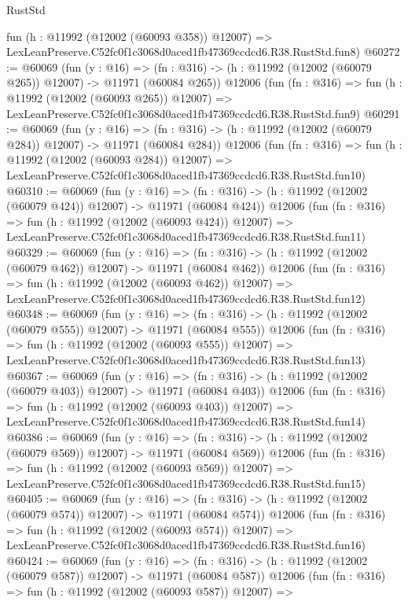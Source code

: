 \begin{lexlean}{RustStd}
\begin{coremodule}
    fun (h : @11992 (@12002 (@60093 @358)) @12007) =>
    LexLeanPreserve.C52fc0f1c3068d0aced1fb47369ccdcd6.R38.RustStd.fun8)
@60272 := @60069
    (fun (y : @16) =>
    (fn : @316) -> (h : @11992 (@12002 (@60079 @265)) @12007) -> @11971 (@60084 @265))
    @12006
    (fun (fn : @316) =>
    fun (h : @11992 (@12002 (@60093 @265)) @12007) =>
    LexLeanPreserve.C52fc0f1c3068d0aced1fb47369ccdcd6.R38.RustStd.fun9)
@60291 := @60069
    (fun (y : @16) =>
    (fn : @316) -> (h : @11992 (@12002 (@60079 @284)) @12007) -> @11971 (@60084 @284))
    @12006
    (fun (fn : @316) =>
    fun (h : @11992 (@12002 (@60093 @284)) @12007) =>
    LexLeanPreserve.C52fc0f1c3068d0aced1fb47369ccdcd6.R38.RustStd.fun10)
@60310 := @60069
    (fun (y : @16) =>
    (fn : @316) -> (h : @11992 (@12002 (@60079 @424)) @12007) -> @11971 (@60084 @424))
    @12006
    (fun (fn : @316) =>
    fun (h : @11992 (@12002 (@60093 @424)) @12007) =>
    LexLeanPreserve.C52fc0f1c3068d0aced1fb47369ccdcd6.R38.RustStd.fun11)
@60329 := @60069
    (fun (y : @16) =>
    (fn : @316) -> (h : @11992 (@12002 (@60079 @462)) @12007) -> @11971 (@60084 @462))
    @12006
    (fun (fn : @316) =>
    fun (h : @11992 (@12002 (@60093 @462)) @12007) =>
    LexLeanPreserve.C52fc0f1c3068d0aced1fb47369ccdcd6.R38.RustStd.fun12)
@60348 := @60069
    (fun (y : @16) =>
    (fn : @316) -> (h : @11992 (@12002 (@60079 @555)) @12007) -> @11971 (@60084 @555))
    @12006
    (fun (fn : @316) =>
    fun (h : @11992 (@12002 (@60093 @555)) @12007) =>
    LexLeanPreserve.C52fc0f1c3068d0aced1fb47369ccdcd6.R38.RustStd.fun13)
@60367 := @60069
    (fun (y : @16) =>
    (fn : @316) -> (h : @11992 (@12002 (@60079 @403)) @12007) -> @11971 (@60084 @403))
    @12006
    (fun (fn : @316) =>
    fun (h : @11992 (@12002 (@60093 @403)) @12007) =>
    LexLeanPreserve.C52fc0f1c3068d0aced1fb47369ccdcd6.R38.RustStd.fun14)
@60386 := @60069
    (fun (y : @16) =>
    (fn : @316) -> (h : @11992 (@12002 (@60079 @569)) @12007) -> @11971 (@60084 @569))
    @12006
    (fun (fn : @316) =>
    fun (h : @11992 (@12002 (@60093 @569)) @12007) =>
    LexLeanPreserve.C52fc0f1c3068d0aced1fb47369ccdcd6.R38.RustStd.fun15)
@60405 := @60069
    (fun (y : @16) =>
    (fn : @316) -> (h : @11992 (@12002 (@60079 @574)) @12007) -> @11971 (@60084 @574))
    @12006
    (fun (fn : @316) =>
    fun (h : @11992 (@12002 (@60093 @574)) @12007) =>
    LexLeanPreserve.C52fc0f1c3068d0aced1fb47369ccdcd6.R38.RustStd.fun16)
@60424 := @60069
    (fun (y : @16) =>
    (fn : @316) -> (h : @11992 (@12002 (@60079 @587)) @12007) -> @11971 (@60084 @587))
    @12006
    (fun (fn : @316) =>
    fun (h : @11992 (@12002 (@60093 @587)) @12007) =>

\end{coremodule}
\end{lexlean}
